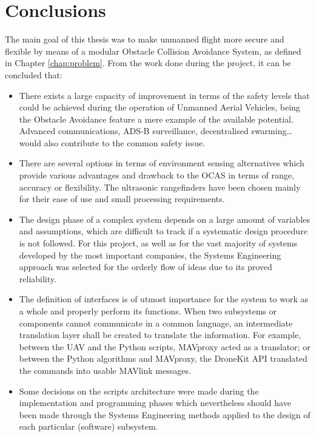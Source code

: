 
\let\textcircled=\pgftextcircled
\chapter{Conclusions} \label{chapter:conclusions}

The main goal of this thesis was to make unmanned flight more secure and flexible by means of a modular Obstacle Collision Avoidance System, as defined in Chapter \ref{chap:problem}. From the work done during the project, it can be concluded that:

\begin{itemize}

	\item There exists a large capacity of improvement in terms of the safety levels that could be achieved during the operation of Unmanned Aerial Vehicles, being the Obstacle Avoidance feature a mere example of the available potential.
		Advanced communications, ADS-B surveillance, decentralised swarming\ldots would also contribute to the common safety issue.

	\item There are several options in terms of environment sensing alternatives which provide various advantages and drawback to the OCAS in terms of range, accuracy or flexibility.
		The ultrasonic rangefinders have been chosen mainly for their ease of use and small processing requirements.

	\item The design phase of a complex system depends on a large amount of variables and assumptions, which are difficult to track if a systematic design procedure is not followed.
		For this project, as well as for the vast majority of systems developed by the most important companies, the Systems Engineering approach was selected for the orderly flow of ideas due to its proved reliability.

	\item The definition of interfaces is of utmost importance for the system to work as a whole and properly perform its functions.
		When two subsystems or components cannot communicate in a common language, an intermediate translation layer shall be created to translate the information.
		For example, between the UAV and the Python scripts, MAVproxy acted as a translator; or between the Python algorithms and MAVproxy, the DroneKit API translated the commands into usable MAVlink messages.

	\item Some decisions on the scripts architecture were made during the implementation and programming phases which nevertheless should have been made through the Systems Engineering methods applied to the design of each particular (software) subsystem.


\end{itemize}
